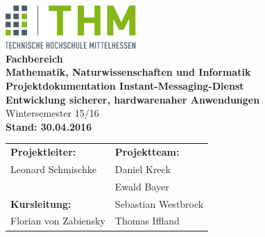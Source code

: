 \documentclass[12pt,a4paper,bibliography=totocnumbered,listof=totocnumbered]{scrartcl}
\begin{document}

\renewcommand{\sectionmark}[1]{\markright{#1}}
\renewcommand{\leftmark}{\rightmark}
\pagestyle{fancy}
\lhead{}
\chead{}
\rhead{\thesection\space\contentsname}
\cfoot{}
\renewcommand{\headrulewidth}{0.4pt}
\renewcommand{\footrulewidth}{0.4pt}

\renewcommand{\thesection}{\Roman{section}}
\renewcommand{\theHsection}{\Roman{section}}


\thispagestyle{empty}
\begin{center}
	\includegraphics[width=5cm]{img/thm2.png}\\
	\vspace*{2cm}
	\Large
	\textbf{Fachbereich}\\
	\textbf{Mathematik, Naturwissenschaften und Informatik }\\
	\vspace*{2cm}
	\Huge
	\textbf{Projektdokumentation Instant-Messaging-Dienst}\\
	\vspace*{1cm}
	\large
	\textbf{Entwicklung sicherer, hardwarenaher Anwendungen}\\
	\normalsize
	\vspace*{0.5cm}
	Wintersemester 15/16\\
	\vspace*{2cm}
	\textbf{Stand: 30.04.2016}
	
	\normalsize
	\vfill
	\begin{tabular}{ l l }
		\textbf{Projektleiter:}  & \textbf{Projektteam:}\\
		Leonard Schmischke & Daniel Kreck\\
		&  Ewald Bayer\\
		\textbf{Kursleitung:} & Sebastian Westbrock\\
		Florian von Zabiensky & Thomas Iffland\\
	\end{tabular}	
\end{center}
\end{document}
